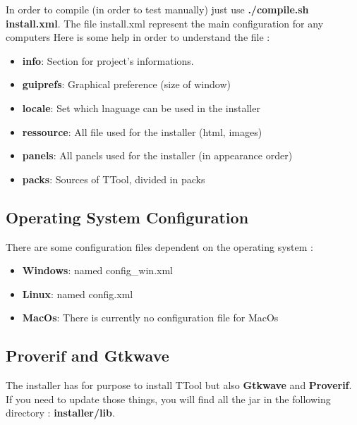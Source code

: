 \documentclass[12pt]{article}
\begin{document}
In order to compile (in order to test manually) just use \textbf{./compile.sh install.xml}. The file install.xml represent the main configuration for any computers \newline
Here is some help in order to understand the file :
\begin{itemize}
\item \textbf{info}: Section for project's informations.
\item \textbf{guiprefs}: Graphical preference (size of window)
\item \textbf{locale}: Set which lnaguage can be used in the installer
\item \textbf{ressource}: All file used for the installer (html, images)
\item \textbf{panels}: All panels used for the installer (in appearance order)
\item \textbf{packs}: Sources of TTool, divided in packs
\end{itemize}

\subsection{Operating System Configuration}
There are some configuration files dependent on the operating system :
\begin{itemize}
\item \textbf{Windows}: named config\_win.xml
\item \textbf{Linux}: named config.xml
\item \textbf{MacOs}: There is currently no configuration file for MacOs
\end{itemize}

\subsection{Proverif and Gtkwave}
The installer has for purpose to install TTool but also \textbf{Gtkwave} and \textbf{Proverif}. If you need to update those things, you will find all the jar in the following directory : \textbf{installer/lib}. \newline
\newpage
\end{document}

